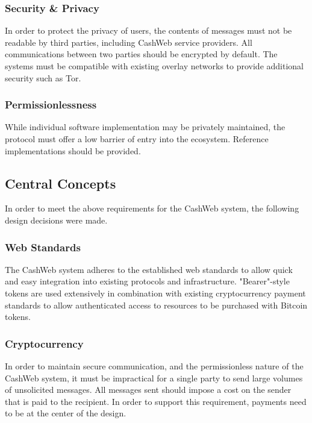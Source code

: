 \documentclass{article}
\begin{document}
\subsubsection{Security \& Privacy}

In order to protect the privacy of users, the contents of messages must not be readable by third parties, including CashWeb service providers. All communications between two parties should be encrypted by default. The systems must be compatible with existing overlay networks to provide additional security such as Tor.

\subsubsection{Permissionlessness}

While individual software implementation may be privately maintained, the protocol must offer a low barrier of entry into the ecosystem. Reference implementations should be provided.

\subsection{Central Concepts}

In order to meet the above requirements for the CashWeb system, the following design decisions were made.

\subsubsection{Web Standards}

The CashWeb system adheres to the established web standards to allow quick and easy integration into existing protocols and infrastructure. "Bearer"-style tokens are used extensively in combination with existing cryptocurrency payment standards to allow authenticated access to resources to be purchased with Bitcoin tokens.

\subsubsection{Cryptocurrency}

In order to maintain secure communication, and the permissionless nature of the CashWeb system, it must be impractical for a single party to send large volumes of unsolicited messages. All messages sent should impose a cost on the sender that is paid to the recipient. In order to support this requirement, payments need to be at the center of the design.
\end{document}
